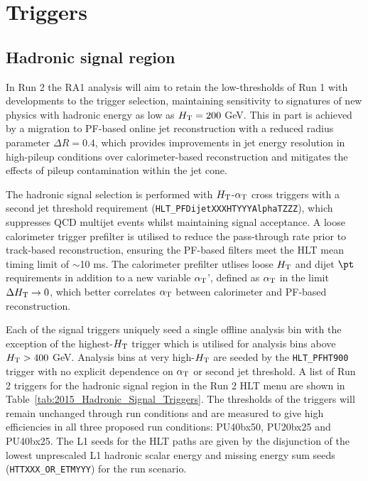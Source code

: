 \section{Triggers}
\label{sec:triggers}


\subsection{Hadronic signal region}


In Run 2 the RA1 analysis will aim to retain the low-thresholds of Run 1 with developments to the trigger selection, maintaining sensitivity to signatures of new physics with hadronic energy as low as $\mbox{$H_\text{T}$} = 200$ GeV. This in part is achieved by a migration to PF-based online jet reconstruction with a reduced radius parameter $\Delta R = 0.4$, which provides improvements in jet energy resolution in high-pileup conditions over calorimeter-based reconstruction and mitigates the effects of pileup contamination within the jet cone.

The hadronic signal selection is performed with $\mbox{$H_\text{T}$}$-$\alpha_{\text{T}}$ cross triggers with a second jet threshold requirement (\verb!HLT_PFDijetXXXHTYYYAlphaTZZZ!), which suppresses QCD multijet events whilst maintaining signal acceptance.  A loose calorimeter trigger prefilter is utilised to reduce the pass-through rate prior to track-based reconstruction, ensuring the PF-based filters meet the HLT mean timing limit of $\sim$10 ms. The calorimeter prefilter utlises loose $\mbox{$H_\text{T}$}$ and dijet $\pt$ requirements in addition to a new variable $\alpha_{\text{T}}$', defined as $\alpha_{\text{T}}$ in the limit $\Delta\mbox{$H_\text{T}$} \rightarrow 0$, which better correlates $\alpha_{\text{T}}$ between calorimeter and PF-based reconstruction.

Each of the signal triggers uniquely seed a single offline analysis bin with the exception of the highest-$\mbox{$H_\text{T}$}$ trigger which is utilised for analysis bins above $\mbox{$H_\text{T}$} > 400$ GeV. Analysis bins at very high-$\mbox{$H_\text{T}$}$ are seeded by the \verb!HLT_PFHT900! trigger with no explicit dependence on $\alpha_{\text{T}}$ or second jet threshold. A list of Run 2 triggers for the hadronic signal region in the Run 2 HLT menu are shown in Table~\ref{tab:2015_Hadronic_Signal_Triggers}. The thresholds of the triggers will remain unchanged through run conditions and are measured to give high efficiencies in all three proposed run conditions: PU40bx50, PU20bx25 and PU40bx25. The L1 seeds for the HLT paths are given by the disjunction of the lowest unprescaled L1 hadronic scalar energy and missing energy sum seeds (\verb!HTTXXX_OR_ETMYYY!) for the run scenario.

